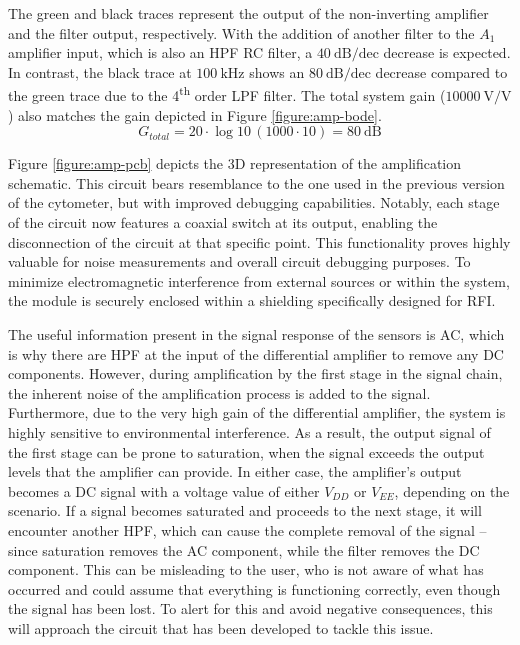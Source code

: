 \noindent
The green and black traces represent the output of the non-inverting amplifier and the filter output, respectively. With the addition of another filter to the $A_1$ amplifier input, which is also an \ac{HPF} \ac{RC} filter, a $\mathrm{40~dB/dec}$ decrease is expected. In contrast, the black trace at $\mathrm{100~kHz}$ shows an $\mathrm{80~dB/dec}$ decrease compared to the green trace due to the 4\textsuperscript{th} order \ac{LPF} filter. The total system gain ($\mathrm{10000~V/V}$) also matches the gain depicted in Figure \ref{figure:amp-bode}.
\begin{equation}
     \nonumber G_{total} = 20\cdot \log{10}\,(1000 \cdot 10) = 80~\mathrm{dB}
\end{equation}

Figure \ref{figure:amp-pcb} depicts the \ac{3D} representation of the amplification schematic. This circuit bears resemblance to the one used in the previous version of the cytometer, but with improved debugging capabilities. Notably, each stage of the circuit now features a coaxial switch at its output, enabling the disconnection of the circuit at that specific point. This functionality proves highly valuable for noise measurements and overall circuit debugging purposes. To minimize electromagnetic interference from external sources or within the system, the module is securely enclosed within a shielding specifically designed for \ac{RFI}.


\noindent
The useful information present in the signal response of the sensors is \ac{AC}, which is why there are \ac{HPF} at the input of the differential amplifier to remove any \ac{DC} components. However, during amplification by the first stage in the signal chain, the inherent noise of the amplification process is added to the signal. Furthermore, due to the very high gain of the differential amplifier, the system is highly sensitive to environmental interference. As a result, the output signal of the first stage can be prone to saturation, when the signal exceeds the output levels that the amplifier can provide. In either case, the amplifier's output becomes a \ac{DC} signal with a voltage value of either $V_{DD}$ or $V_{EE}$, depending on the scenario. If a signal becomes saturated and proceeds to the next stage, it will encounter another \ac{HPF}, which can cause the complete removal of the signal -- since saturation removes the \ac{AC} component, while the filter removes the \ac{DC} component. This can be misleading to the user, who is not aware of what has occurred and could assume that everything is functioning correctly, even though the signal has been lost. To alert for this and avoid negative consequences, this will approach the circuit that has been developed to tackle this issue. 

